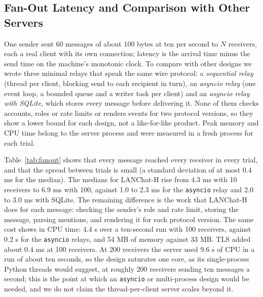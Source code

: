 \documentclass[conference]{IEEEtran}
\newcommand{\code}[1]{\texttt{#1}}
\begin{document}
\subsection{Fan-Out Latency and Comparison with Other Servers}\label{sec:eval-fanout}
One sender sent 60 messages of about 100 bytes at ten per second to $N$ receivers, each a real client with its own connection; latency is the arrival time minus the send time on the machine's monotonic clock. To compare with other designs we wrote three minimal relays that speak the same wire protocol: a \emph{sequential relay} (thread per client, blocking send to each recipient in turn), an \emph{asyncio relay} (one event loop, a bounded queue and a writer task per client) and an \emph{asyncio relay with SQLite}, which stores every message before delivering it. None of them checks accounts, roles or rate limits or renders events for two protocol versions, so they show a lower bound for each design, not a like-for-like product. Peak memory and CPU time belong to the server process and were measured in a fresh process for each trial.

Table~\ref{tab:fanout} shows that every message reached every receiver in every trial, and that the spread between trials is small (a standard deviation of at most 0.4 ms for the median). The medians for LANChat-H rise from 4.3 ms with 10 receivers to 6.9 ms with 100, against 1.0 to 2.3 ms for the \code{asyncio} relay and 2.0 to 3.0 ms with SQLite. The remaining difference is the work that LANChat-H does for each message: checking the sender's role and rate limit, storing the message, parsing mentions, and rendering it for each protocol version. The same cost shows in CPU time: 4.4 s over a ten-second run with 100 receivers, against 0.2 s for the \code{asyncio} relays, and 54 MB of memory against 33 MB. TLS added about 0.4 ms at 100 receivers. At 200 receivers the server used 9.6 s of CPU in a run of about ten seconds, so the design saturates one core, as its single-process Python threads would suggest, at roughly 200 receivers sending ten messages a second; this is the point at which an \code{asyncio} or multi-process design would be needed, and we do not claim the thread-per-client server scales beyond it.
\end{document}
